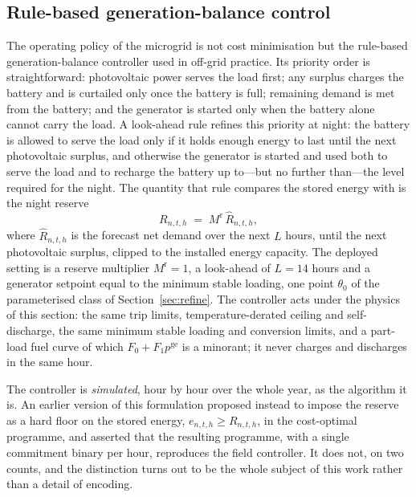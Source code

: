 \documentclass[11pt,a4paper]{article}
\theoremstyle{plain}
\theoremstyle{definition}
\begin{document}
\subsection{Rule-based generation-balance control}
\label{sec:dispatch}

The operating policy of the microgrid is not cost minimisation but the rule-based
generation-balance controller used in off-grid practice. Its priority order is
straightforward: photovoltaic power serves the load first; any surplus charges the
battery and is curtailed only once the battery is full; remaining demand is met from the
battery; and the generator is started only when the battery alone cannot carry the load.
A look-ahead rule refines this priority at night: the battery is allowed to serve the
load only if it holds enough energy to last until the next photovoltaic surplus, and
otherwise the generator is started and used both to serve the load and to recharge the
battery up to---but no further than---the level required for the night. The quantity that
rule compares the stored energy with is the night reserve
\begin{equation}
  R_{n,t,h} \;=\; M^{\mathrm{r}}\,\hat R_{n,t,h},
  \label{eq:night-reserve}
\end{equation}
where $\hat R_{n,t,h}$ is the forecast net demand over the next $L$ hours, until the next
photovoltaic surplus, clipped to the installed energy capacity. The deployed setting is a
reserve multiplier $M^{\mathrm{r}}=1$, a look-ahead of $L=14$ hours and a generator
setpoint equal to the minimum stable loading, one point $\theta_0$ of the parameterised
class of Section~\ref{sec:refine}. The controller acts under the physics of this section:
the same trip limits, temperature-derated ceiling and self-discharge, the same minimum
stable loading and conversion limits, and a part-load fuel curve of which
$F_0+F_1p^{\mathrm{ge}}$ is a minorant; it never charges and discharges in the same hour.

The controller is \emph{simulated}, hour by hour over the whole year, as the algorithm it
is. An earlier version of this formulation proposed instead to impose the reserve as a
hard floor on the stored energy, $e_{n,t,h}\ge R_{n,t,h}$, in the cost-optimal programme,
and asserted that the resulting programme, with a single commitment binary per hour,
reproduces the field controller. It does not, on two counts, and the distinction turns
out to be the whole subject of this work rather than a detail of encoding.
\end{document}
